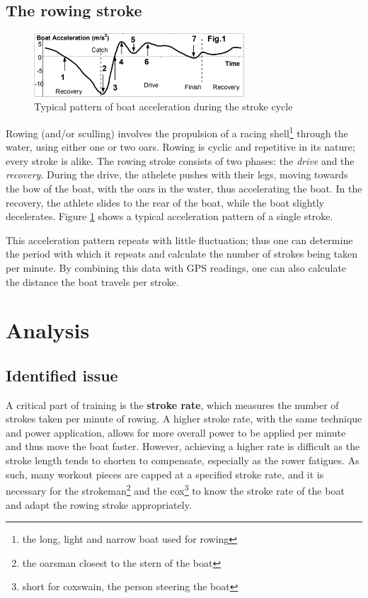 \documentclass[11pt,twoside,a4paper]{report}
\begin{document}
\section{The rowing stroke}

\begin{figure}[ht]
    \centering
    \includegraphics[width=0.7\textwidth]{rowing-stroke}
    \caption{Typical pattern of boat acceleration during the stroke cycle \cite{dr_valery_kleshnev_analysis_2012}}
    \label{fig:rowing-stroke}
\end{figure}

Rowing (and/or sculling) involves the propulsion of a racing shell\footnote{the long, light and narrow boat used for rowing} through the water, using either one or two oars. 
Rowing is cyclic and repetitive in its nature; every stroke is alike. 
The rowing stroke consists of two phases: the \textit{drive} and the \textit{recovery}. 
During the drive, the athelete pushes with their legs, moving towards the bow of the boat, with the oars in the water, thus accelerating the boat.
In the recovery, the athlete slides to the rear of the boat, while the boat slightly decelerates.
Figure \ref{fig:rowing-stroke} shows a typical acceleration pattern of a single stroke.

This acceleration pattern repeats with little fluctuation; thus one can determine the period with which it repeats and calculate the number of strokes being taken per minute. By combining this data with GPS readings, one can also calculate the distance the boat travels per stroke.

\chapter{Analysis}

\section{Identified issue}

A critical part of training is the \textbf{stroke rate}, which measures the number of strokes taken per minute of rowing. A higher stroke rate, with the same technique and power application, allows for more overall power to be applied per minute and thus move the boat faster. However, achieving a higher rate is difficult as the stroke length tends to shorten to compensate, especially as the rower fatigues. As such, many workout pieces are capped at a specified stroke rate, and it is necessary for the strokeman\footnote{the oarsman closest to the stern of the boat} and the cox\footnote{short for coxswain, the person steering the boat} to know the stroke rate of the boat and adapt the rowing stroke appropriately.
\end{document}
